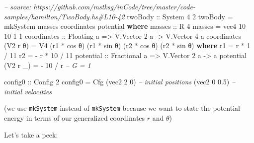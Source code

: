 \documentclass[]{article}
\newenvironment{Shaded}{}{}
\newcommand{\KeywordTok}[1]{\textcolor[rgb]{0.00,0.44,0.13}{\textbf{{#1}}}}
\newcommand{\DataTypeTok}[1]{\textcolor[rgb]{0.56,0.13,0.00}{{#1}}}
\newcommand{\DecValTok}[1]{\textcolor[rgb]{0.25,0.63,0.44}{{#1}}}
\newcommand{\FloatTok}[1]{\textcolor[rgb]{0.25,0.63,0.44}{{#1}}}
\newcommand{\CommentTok}[1]{\textcolor[rgb]{0.38,0.63,0.69}{\textit{{#1}}}}
\newcommand{\OtherTok}[1]{\textcolor[rgb]{0.00,0.44,0.13}{{#1}}}
\newcommand{\FunctionTok}[1]{\textcolor[rgb]{0.02,0.16,0.49}{{#1}}}
\newcommand{\NormalTok}[1]{{#1}}
\begin{document}
\begin{Shaded}
\begin{Highlighting}[]
\CommentTok{-- source: https://github.com/mstksg/inCode/tree/master/code-samples/hamilton/TwoBody.hs#L10-42}
\OtherTok{twoBody ::} \DataTypeTok{System} \DecValTok{4} \DecValTok{2}
\NormalTok{twoBody }\FunctionTok{=} \NormalTok{mkSystem masses coordinates potential}
  \KeywordTok{where}
\OtherTok{    masses ::} \DataTypeTok{R} \DecValTok{4}
    \NormalTok{masses }\FunctionTok{=} \NormalTok{vec4 }\DecValTok{10} \DecValTok{10} \DecValTok{1} \DecValTok{1}
    \NormalTok{coordinates}
\OtherTok{        ::} \DataTypeTok{Floating} \NormalTok{a}
        \OtherTok{=>} \DataTypeTok{V.Vector} \DecValTok{2} \NormalTok{a}
        \OtherTok{->} \DataTypeTok{V.Vector} \DecValTok{4} \NormalTok{a}
    \NormalTok{coordinates (}\DataTypeTok{V2} \NormalTok{r θ) }\FunctionTok{=} \DataTypeTok{V4} \NormalTok{(r1 }\FunctionTok{*} \NormalTok{cos θ) (r1 }\FunctionTok{*} \NormalTok{sin θ)}
                              \NormalTok{(r2 }\FunctionTok{*} \NormalTok{cos θ) (r2 }\FunctionTok{*} \NormalTok{sin θ)}
      \KeywordTok{where}
        \NormalTok{r1 }\FunctionTok{=}   \NormalTok{r }\FunctionTok{*}  \DecValTok{1} \FunctionTok{/} \DecValTok{11}
        \NormalTok{r2 }\FunctionTok{=} \FunctionTok{-} \NormalTok{r }\FunctionTok{*} \DecValTok{10} \FunctionTok{/} \DecValTok{11}
    \NormalTok{potential}
\OtherTok{        ::} \DataTypeTok{Fractional} \NormalTok{a}
        \OtherTok{=>} \DataTypeTok{V.Vector} \DecValTok{2} \NormalTok{a}
        \OtherTok{->} \NormalTok{a}
    \NormalTok{potential (}\DataTypeTok{V2} \NormalTok{r _) }\FunctionTok{=} \FunctionTok{-} \DecValTok{10} \FunctionTok{/} \NormalTok{r       }\CommentTok{-- G = 1}

\OtherTok{config0 ::} \DataTypeTok{Config} \DecValTok{2}
\NormalTok{config0 }\FunctionTok{=} \DataTypeTok{Cfg} \NormalTok{(vec2 }\DecValTok{2}   \DecValTok{0}\NormalTok{)  }\CommentTok{-- initial positions}
              \NormalTok{(vec2 }\DecValTok{0} \FloatTok{0.5}\NormalTok{)  }\CommentTok{-- initial velocities}
\end{Highlighting}
\end{Shaded}

(we use \texttt{mkSystem} instead of \texttt{mkSystem\textquotesingle{}} because
we want to state the potential energy in terms of our generalized coordinates
\(r\) and \(\theta\))

Let's take a peek:
\end{document}
